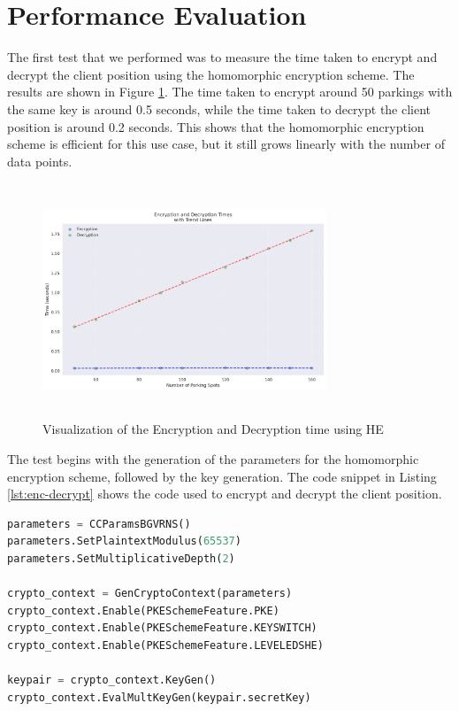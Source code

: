 \section{Performance Evaluation} \label{sec:testing-performance}

The first test that we performed was to measure the time taken to encrypt and decrypt the client position using the homomorphic encryption scheme. The results are shown in Figure \ref{fig:testing-enc}. The time taken to encrypt around 50 parkings with the same key is around 0.5 seconds, while the time taken to decrypt the client position is around 0.2 seconds. This shows that the homomorphic encryption scheme is efficient for this use case, but it still grows linearly with the number of data points.

\begin{figure}[h]
    \centering
    \includegraphics[width=8.5cm,height=7cm]{img/crypto_times.png}
    \caption{Visualization of the Encryption and Decryption time using HE}
    \label{fig:testing-enc}
\end{figure}

The test begins with the generation of the parameters for the homomorphic encryption scheme, followed by the key generation. The code snippet in Listing \ref{lst:enc-decrypt} shows the code used to encrypt and decrypt the client position.

\newpage

\begin{lstlisting}[language=python, caption={Encryption and Decryption of the client position}, label={lst:enc-decrypt}]
parameters = CCParamsBGVRNS()
parameters.SetPlaintextModulus(65537)
parameters.SetMultiplicativeDepth(2)

crypto_context = GenCryptoContext(parameters)
crypto_context.Enable(PKESchemeFeature.PKE)
crypto_context.Enable(PKESchemeFeature.KEYSWITCH)
crypto_context.Enable(PKESchemeFeature.LEVELEDSHE)

keypair = crypto_context.KeyGen()
crypto_context.EvalMultKeyGen(keypair.secretKey)
\end{lstlisting}


